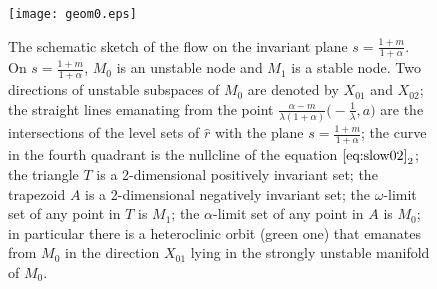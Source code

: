 \documentclass[usletter,11pt]{article}
\theoremstyle{remark}
\begin{document}
\begin{figure}[ht]
 \centering
  \texttt{[image: geom0.eps]} \label{fig:flow0}
  \caption{The schematic sketch of the flow on the invariant plane $s=\frac{1+m}{1+\alpha}$.   On $s=\frac{1+m}{1+\alpha}$, $M_0$ is an unstable node and $M_1$ is a stable node. Two directions of unstable subspaces of $M_0$ are denoted by $X_{01}$ and $X_{02}$; the straight lines emanating from the 
  point $\frac{\alpha-m}{\lambda(1+\alpha)}\big(-\frac{1}{\lambda},a\big)$ are the intersections of the level sets of $\hat{r}$ 
  with the plane $s=\frac{1+m}{1+\alpha}$; the curve in the fourth quadrant is the nullcline of the equation $\eqref{eq:slow02}_2$; the triangle $T$ is a 2-dimensional positively invariant set; the trapezoid $A$ is a 2-dimensional negatively invariant set; the $\omega$-limit set of any point in $T$ is $M_1$; 
  the $\alpha$-limit set of any point in $A$ is $M_0$; in particular there is a heteroclinic orbit (green one) that emanates from $M_0$ in the direction $X_{01}$ lying
  in the strongly unstable manifold of $M_0$.} 
\end{figure}
\end{document}
